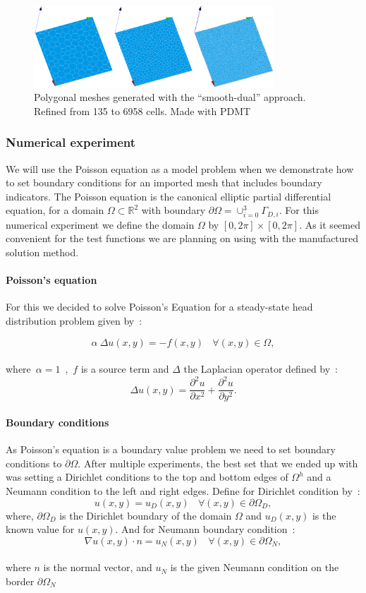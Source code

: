 \documentclass{article}
\begin{document}
\begin{figure}[htbp]
	\centering
	\includegraphics[width=0.8\textwidth]{./Images/polyMesh}
	\caption{\label{fig:polyMesh} Polygonal meshes generated with the ``smooth-dual'' approach. Refined from 135 to 6958 cells. Made with PDMT~\cite{Badri_pdmt}}
\end{figure}

\subsubsection{Numerical experiment}

We will use the Poisson equation as a model problem when we demonstrate how to set boundary conditions for an imported mesh that includes boundary indicators. The Poisson equation is the canonical elliptic partial differential equation, for a domain $\Omega \subset \mathbb{R}^2$ with boundary $\partial \Omega = \cup_{i = 0}^3 \Gamma_{D, i}$. For this numerical experiment we define the domain $\Omega$ by $[0, 2\pi] \times [0, 2\pi]$. As it seemed convenient for the test functions we are planning on using with the manufactured solution method.

\paragraph{Poisson's equation}
For this we decided to solve Poisson's Equation for a steady-state head distribution problem given by~:

\[
\boxed{\alpha~\Delta u(x,y) = - f(x,y) ~~~~\forall (x,y) \in \Omega},
\]\\
where~$\alpha = 1$~,~$f$ is a source term and $\Delta$ the Laplacian operator defined by~:
\[
\Delta{u(x,y)} = \frac{{\partial^2 u}}{\partial x^2} + \frac{{\partial^2 u}}{\partial y^2}.
\]

\paragraph{Boundary conditions}
As Poisson's equation is a boundary value problem we need to set boundary conditions to $\partial\Omega$. After multiple experiments, the best set that we ended up with was setting a Dirichlet conditions to the top and bottom edges of $\Omega^h$ and a Neumann condition to the left and right edges. Define for Dirichlet condition by~:
\[
u(x,y) = u_D(x,y)~~~~\forall (x,y) \in \partial\Omega_D,
\]
where, $\partial\Omega_D$ is the Dirichlet boundary of the domain $\Omega$ and $u_D(x,y)$ is the known value for $u(x,y)$. And for Neumann boundary condition~:
\[
\nabla u(x,y) \cdot n = u_N(x,y)~~~~\forall (x,y) \in \partial\Omega_N,
\]\\
where $n$ is the normal vector, and $u_N$ is the given Neumann condition on the border $\partial\Omega_N$
\end{document}
